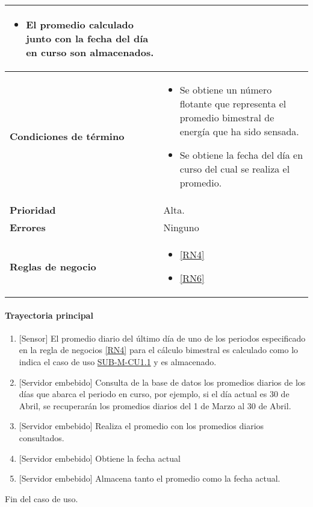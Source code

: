 \begin{longtable}{|J{5cm}|J{10.3cm}|}
\begin{itemize}
			\item El promedio calculado junto con la fecha del día en curso son almacenados.
		\end{itemize}\\ \hline
	\textbf{Condiciones de término} & 
		\begin{itemize}
			\item Se obtiene un número flotante que representa el promedio bimestral de energía que ha sido sensada.
			\item Se obtiene la fecha del día en curso del cual se realiza el promedio.
		\end{itemize} \\ \hline 
	\textbf{Prioridad} & 
		Alta. \\ \hline
	\textbf{Errores} & 
		Ninguno \\ \hline
	\textbf{Reglas de negocio} & 
		\begin{itemize}
			\item \ref{RN4}
			\item \ref{RN6}
		\end{itemize} \\ \hline

\end{longtable}

\paragraph{Trayectoria principal}
	\begin{enumerate}
		\item {[Sensor]} El promedio diario del último día de uno de los periodos especificado en la regla de negocios \ref{RN4} para el cálculo bimestral es calculado como lo indica el caso de uso \hyperref[SUB-M-CU1.1]{SUB-M-CU1.1} y es almacenado.
		\item  {[Servidor embebido]} Consulta de la base de datos los promedios diarios de los días que abarca el periodo en curso, por ejemplo, si el día actual es 30 de Abril, se recuperarán los promedios diarios del 1 de Marzo al 30 de Abril.
		\item {[Servidor embebido]} Realiza el promedio con los promedios diarios consultados.
		\item {[Servidor embebido]} Obtiene la fecha actual
		\item {[Servidor embebido]} Almacena tanto el promedio como la fecha actual.
	\end{enumerate}
	Fin del caso de uso.
